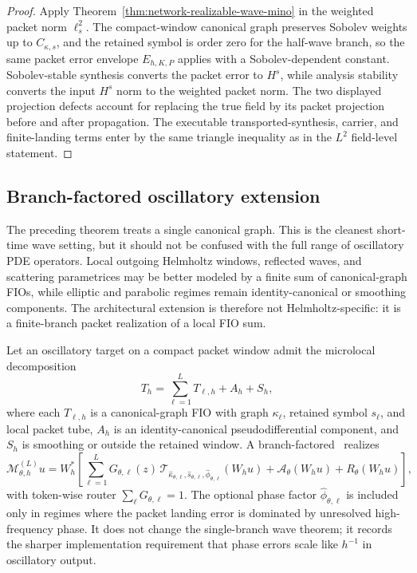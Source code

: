 \begin{proof}
Apply Theorem~\ref{thm:network-realizable-wave-mino} in the weighted packet norm $\ell^2_s$.  The compact-window canonical graph preserves Sobolev weights up to $C_{\kappa,s}$, and the retained symbol is order zero for the half-wave branch, so the same packet error envelope $E_{h,K,P}$ applies with a Sobolev-dependent constant.  Sobolev-stable synthesis converts the packet error to $H^s$, while analysis stability converts the input $H^s$ norm to the weighted packet norm.  The two displayed projection defects account for replacing the true field by its packet projection before and after propagation.  The executable transported-synthesis, carrier, and finite-landing terms enter by the same triangle inequality as in the $L^2$ field-level statement.
\end{proof}

\subsection{Branch-factored oscillatory extension}
\label{sec:branch-factored-extension}

The preceding theorem treats a single canonical graph.  This is the cleanest short-time wave setting, but it should not be confused with the full range of oscillatory PDE operators.  Local outgoing Helmholtz windows, reflected waves, and scattering parametrices may be better modeled by a finite sum of canonical-graph FIOs, while elliptic and parabolic regimes remain identity-canonical or smoothing components.  The architectural extension is therefore not Helmholtz-specific: it is a finite-branch packet realization of a local FIO sum.

Let an oscillatory target on a compact packet window admit the microlocal decomposition
\[
T_h
=
\sum_{\ell=1}^{L} T_{\ell,h}
+A_h+S_h,
\]
where each $T_{\ell,h}$ is a canonical-graph FIO with graph $\kappa_\ell$, retained symbol $s_\ell$, and local packet tube, $A_h$ is an identity-canonical pseudodifferential component, and $S_h$ is smoothing or outside the retained window.  A branch-factored \MiNO\ realizes
\[
\mathcal M_{\theta,h}^{(L)}u
=
W_h^\ast
\left[
\sum_{\ell=1}^{L}
G_{\theta,\ell}(z)\,
\mathcal T_{\hat\kappa_{\theta,\ell},\hat s_{\theta,\ell},\hat\phi_{\theta,\ell}}(W_hu)
+\mathcal A_\theta(W_hu)
+R_\theta(W_hu)
\right],
\]
with token-wise router $\sum_{\ell}G_{\theta,\ell}=1$.  The optional phase factor $\hat\phi_{\theta,\ell}$ is included only in regimes where the packet landing error is dominated by unresolved high-frequency phase.  It does not change the single-branch wave theorem; it records the sharper implementation requirement that phase errors scale like $h^{-1}$ in oscillatory output.

